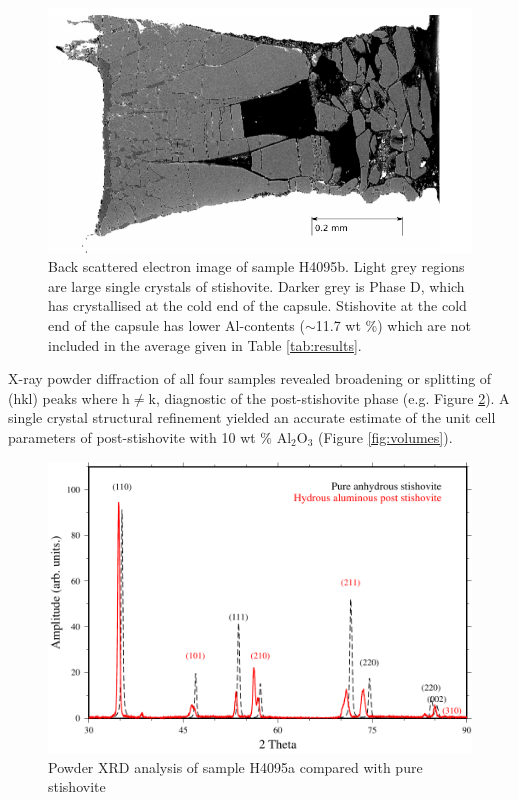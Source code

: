 \documentclass[review]{elsarticle}
\begin{document}
\begin{figure}[ht!]
  \centering
  \includegraphics[width=1.0\textwidth]{figures/H4095b.pdf}
  \caption{Back scattered electron image of sample H4095b. Light grey regions are large single crystals of stishovite. Darker grey is Phase D, which has crystallised at the cold end of the capsule. Stishovite at the cold end of the capsule has lower Al-contents ($\sim$11.7 wt \%) which are not included in the average given in Table \ref{tab:results}.}
  \label{fig:sem}
\end{figure}

X-ray powder diffraction of all four samples revealed broadening or splitting of (hkl) peaks where h$\neq$k, diagnostic of the post-stishovite phase (e.g. Figure \ref{fig:xrd}). A single crystal structural refinement yielded an accurate estimate of the unit cell parameters of post-stishovite with 10 wt \% Al$_2$O$_3$ (Figure \ref{fig:volumes}).
\begin{figure}[ht!]
  \centering
  \includegraphics[width=1.0\textwidth]{figures/stv_xrd_comparison.pdf}
  \caption{Powder XRD analysis of sample H4095a compared with pure stishovite}
  \label{fig:xrd}
\end{figure}
\end{document}

